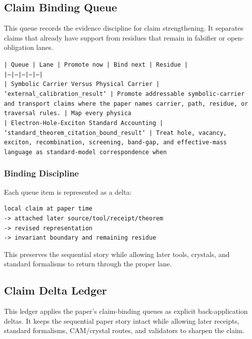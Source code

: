 \documentclass[11pt]{article}
\begin{document}
\subsection*{Claim Binding Queue}

This queue records the evidence discipline for claim strengthening. It separates claims that already have support from residues that remain in falsifier or open-obligation lanes.

\noindent\texttt{| Queue | Lane | Promote now | Bind next | Residue |}\\
\noindent\texttt{|---|---|---|---|---|}\\
\noindent\texttt{| Symbolic Carrier Versus Physical Carrier | `external\_calibration\_result` | Promote addressable symbolic-carrier and transport claims where the paper names carrier, path, residue, or traversal rules. | Map every physica}\\
\noindent\texttt{| Electron-Hole-Exciton Standard Accounting | `standard\_theorem\_citation\_bound\_result` | Treat hole, vacancy, exciton, recombination, screening, band-gap, and effective-mass language as standard-model correspondence when}\\

\subsubsection*{Binding Discipline}

Each queue item is represented as a delta:

\begin{verbatim}
local claim at paper time
-> attached later source/tool/receipt/theorem
-> revised representation
-> invariant boundary and remaining residue
\end{verbatim}

This preserves the sequential story while allowing later tools, crystals, and
standard formalisms to return through the proper lane.

\subsection*{Claim Delta Ledger}

This ledger applies the paper's claim-binding queues as explicit back-application
deltas. It keeps the sequential paper story intact while allowing later
receipts, standard formalisms, CAM/crystal routes, and validators to sharpen the
claim.
\end{document}

